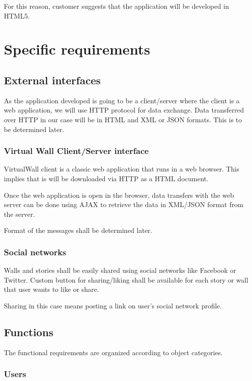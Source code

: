 \documentclass[11pt]{book}
\begin{document}
For this reason, customer suggests that the application will be developed in HTML5.

\section{Specific requirements}\label{section:specificrequirements}

\subsection{External interfaces}
As the application developed is going to be a client/server where the client is a web application, we will use HTTP protocol for data exchange. Data transferred over HTTP in our case will be in HTML and XML or JSON formats. This is to be determined later.

\subsubsection{Virtual Wall Client/Server interface}
VirtualWall client is a classic web application that runs in a web browser. This implies that is will be downloaded via HTTP as a HTML document.

Once the web application is open in the browser, data transfers with the web server can be done using AJAX to retrieve the data in XML/JSON format from the server.

Format of the messages shall be determined later.

\subsubsection{Social networks}\label{section:socialnetworks}
Walls and stories shall be easily shared using social networks like Facebook or Twitter. Custom button for sharing/liking shall be available for each story or wall that user wants to like or share.

Sharing in this case means posting a link on user’s social network profile.

\subsection{Functions}
The functional requirements are organized according to object categories.

\subsubsection{Users}
\end{document}
